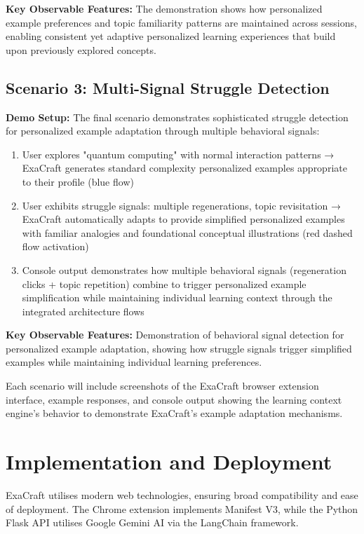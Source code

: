\documentclass[sigconf]{acmart}
\begin{document}
\textbf{Key Observable Features:} The demonstration shows how personalized example preferences and topic familiarity patterns are maintained across sessions, enabling consistent yet adaptive personalized learning experiences that build upon previously explored concepts.

\subsection{Scenario 3: Multi-Signal Struggle Detection}

\textbf{Demo Setup:} The final scenario demonstrates sophisticated struggle detection for personalized example adaptation through multiple behavioral signals:

\begin{enumerate}
    \item User explores "quantum computing" with normal interaction patterns → ExaCraft generates standard complexity personalized examples appropriate to their profile (blue flow)
    \item User exhibits struggle signals: multiple regenerations, topic revisitation → ExaCraft automatically adapts to provide simplified personalized examples with familiar analogies and foundational conceptual illustrations (red dashed flow activation)
    \item Console output demonstrates how multiple behavioral signals (regeneration clicks + topic repetition) combine to trigger personalized example simplification while maintaining individual learning context through the integrated architecture flows
\end{enumerate}

\textbf{Key Observable Features:} Demonstration of behavioral signal detection for personalized example adaptation, showing how struggle signals trigger simplified examples while maintaining individual learning preferences.

Each scenario will include screenshots of the ExaCraft browser extension interface, example responses, and console output showing the learning context engine's behavior to demonstrate ExaCraft's example adaptation mechanisms.

\section{Implementation and Deployment}

ExaCraft utilises modern web technologies, ensuring broad compatibility and ease of deployment. The Chrome extension implements Manifest V3, while the Python Flask API utilises Google Gemini AI via the LangChain framework.
\end{document}
